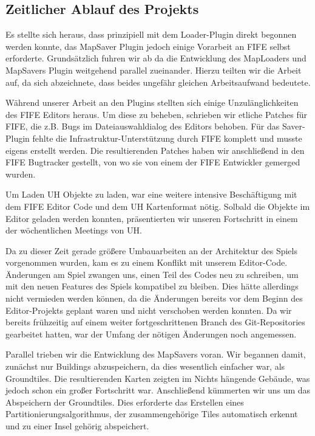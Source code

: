 \subsection{Zeitlicher Ablauf des Projekts}
 Es stellte sich heraus, dass
prinzipiell mit dem Loader-Plugin direkt begonnen werden konnte, das MapSaver
Plugin jedoch einige Vorarbeit an FIFE selbst erforderte. Grundsätzlich fuhren
wir ab da die Entwicklung des MapLoaders und MapSavers Plugin weitgehend
parallel zueinander. Hierzu teilten wir die Arbeit auf, da sich abzeichnete,
dass beides ungefähr gleichen Arbeitsaufwand bedeutete.

Während unserer Arbeit an den Plugins stellten sich einige Unzulänglichkeiten
des FIFE Editors heraus. Um diese zu beheben, schrieben wir etliche Patches für
FIFE, die z.B.
Bugs im Dateiauswahldialog des Editors behoben. Für das Saver-Plugin fehlte die
Infrastruktur-Unterstützung durch FIFE komplett und musste eigens erstellt
werden. Die resultierenden Patches haben wir anschließend in den FIFE Bugtracker
gestellt, von wo sie von einem der FIFE Entwickler gemerged wurden.


Um Laden UH Objekte zu laden, war eine weitere intensive Beschäftigung mit dem
FIFE Editor Code und dem UH Kartenformat nötig. Solbald die Objekte im Editor
geladen werden konnten, präsentierten wir unseren Fortschritt in einem der
wöchentlichen Meetings von UH.

Da zu dieser Zeit gerade größere Umbauarbeiten an der Architektur des Spiels vorgenommen wurden,
kam es zu einem Konflikt mit unserem Editor-Code. Änderungen am Spiel zwangen uns, einen Teil
des Codes neu zu schreiben, um mit den neuen Features des Spiels kompatibel zu bleiben. Dies
hätte allerdings nicht vermieden werden können, da die Änderungen bereits vor dem Beginn des
Editor-Projekts geplant waren und nicht verschoben werden konnten. Da wir bereits frühzeitig
auf einem weiter fortgeschrittenen Branch des Git-Repositories gearbeitet hatten, war der
Umfang der nötigen Änderungen noch angemessen.


Parallel trieben wir die Entwicklung des MapSavers voran. Wir begannen damit,
zunächst nur Buildings abzuspeichern, da dies wesentlich einfacher war, als
Groundtiles. Die resultierenden Karten zeigten im Nichts hängende Gebäude, was
jedoch schon ein großer Fortschritt war.
Anschließend kümmerten wir uns um das Abspeichern der Groundtiles. Dies
erforderte das Erstellen eines Partitionierungsalgorithmus, der zusammengehörige
Tiles automatisch erkennt und zu einer Insel gehörig abspeichert.

